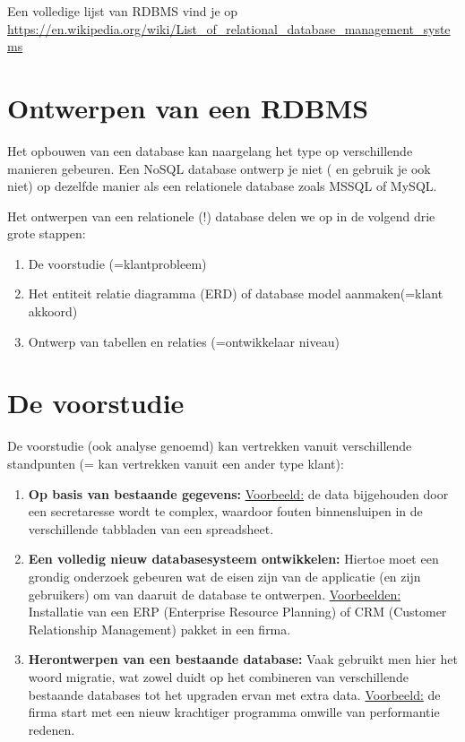 \documentclass{article}
\newcommand{\bold}[1]{\textbf{#1}}
\begin{document}
Een volledige lijst van RDBMS vind je op \url{
    https://en.wikipedia.org/wiki/List\_of\_relational\_database\_management\_systems
    }

\section{Ontwerpen van een RDBMS}
Het opbouwen van een database kan naargelang het type op verschillende manieren gebeuren. Een NoSQL
database ontwerp je niet ( en gebruik je ook niet) op dezelfde manier als een relationele database zoals MSSQL
of MySQL.

Het ontwerpen van een relationele (!) database delen we op in de volgend drie grote stappen:
\begin{enumerate}
    \item De voorstudie (=klantprobleem)
    \item Het entiteit relatie diagramma (ERD) of database model aanmaken(=klant akkoord)
    \item Ontwerp van tabellen en relaties (=ontwikkelaar niveau)
\end{enumerate}

\section{De voorstudie}

De voorstudie (ook analyse genoemd) kan vertrekken vanuit verschillende standpunten (= kan vertrekken vanuit
een ander type klant):

\begin{enumerate}
    \item \bold{Op basis van bestaande gegevens:}
    \underline{Voorbeeld:} de data bijgehouden door een secretaresse wordt te complex, waardoor fouten binnensluipen
    in de verschillende tabbladen van een spreadsheet.
    \item \bold{Een volledig nieuw databasesysteem ontwikkelen:} Hiertoe moet een grondig onderzoek gebeuren wat de
    eisen zijn van de applicatie (en zijn gebruikers) om van daaruit de database te ontwerpen.
    \underline{Voorbeelden:} Installatie van een ERP (Enterprise Resource Planning) of CRM (Customer Relationship
    Management) pakket in een firma.
    \item \bold{Herontwerpen van een bestaande database:} Vaak gebruikt men hier het woord migratie, wat zowel duidt
    op het combineren van verschillende bestaande databases tot het upgraden ervan met extra data.
    \underline{Voorbeeld:} de firma start met een nieuw krachtiger programma omwille van performantie redenen.
\end{enumerate}
\end{document}
